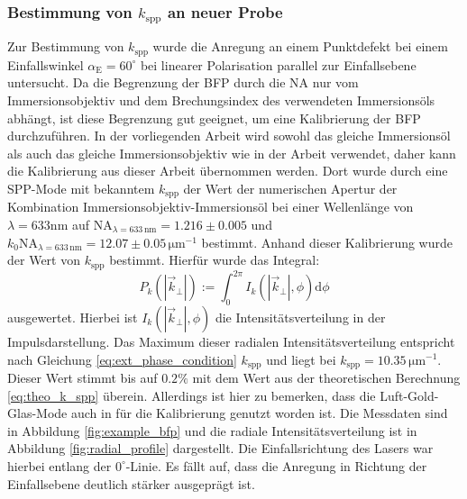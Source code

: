 \documentclass[titlepage,  ngerman]{article}
\begin{document}
	\subsubsection{Bestimmung von  $k_{\mathrm{spp}}$ an neuer Probe}
	Zur Bestimmung von $k_{\mathrm{spp}}$ wurde die Anregung an einem Punktdefekt bei einem Einfallswinkel $\alpha_{\mathrm{E}} = 60^\circ$ bei linearer Polarisation parallel zur Einfallsebene untersucht. Da die Begrenzung der BFP durch die NA nur vom Immersionsobjektiv und dem Brechungsindex des verwendeten Immersionsöls abhängt, ist diese Begrenzung gut geeignet, um eine Kalibrierung der BFP durchzuführen. In der vorliegenden Arbeit wird sowohl das gleiche Immersionsöl als auch das gleiche Immersionsobjektiv wie in der Arbeit \cite{Jaruschewski.2020} verwendet, daher kann die Kalibrierung aus dieser Arbeit übernommen werden. Dort wurde durch eine SPP-Mode mit bekanntem $k_{\mathrm{spp}}$ der Wert der numerischen Apertur der Kombination Immersionsobjektiv-Immersionsöl bei einer Wellenlänge von $\lambda=633\mathrm{nm}$ auf $\mathrm{NA}_{\lambda = 633 \,\mathrm{nm}} = 1.216 \pm 0.005$  und $k_0\mathrm{NA}_{\lambda = 633 \, \mathrm{nm}} = 12.07 \pm 0.05\,\mathrm{\mu m}^{-1}$ bestimmt. Anhand dieser Kalibrierung wurde der Wert von $k_{\mathrm{spp}}$ bestimmt. Hierfür wurde das Integral:
	\begin{equation}
		P_k\left(|\vec{k}_{\bot}|\right) := \int_{0}^{2 \pi} I_k\left(|\vec{k}_{\bot}|, \phi\right)\mathrm{d}\phi
	\end{equation}	 
	ausgewertet. Hierbei ist $I_k\left(|\vec{k}_{\bot}|, \phi\right)$ die Intensitätsverteilung in der Impulsdarstellung. Das Maximum dieser radialen Intensitätsverteilung entspricht nach Gleichung \eqref{eq:ext_phase_condition} $k_{\mathrm{spp}}$ und liegt bei $k_{\mathrm{spp}}= 10.35\,\mathrm{\mu m}^{-1}$. Dieser Wert stimmt bis auf $0.2\%$ mit dem Wert aus der theoretischen Berechnung \eqref{eq:theo_k_spp} überein. Allerdings ist hier zu bemerken, dass die Luft-Gold-Glas-Mode auch in \cite{Jaruschewski.2020} für die Kalibrierung genutzt worden ist. Die Messdaten sind in Abbildung \ref{fig:example_bfp} und die radiale Intensitätsverteilung ist in Abbildung \ref{fig:radial_profile} dargestellt. Die Einfallsrichtung des Lasers war hierbei entlang der $0^\circ$-Linie. Es fällt auf, dass die Anregung in Richtung der Einfallsebene deutlich stärker ausgeprägt ist. 
\end{document}
